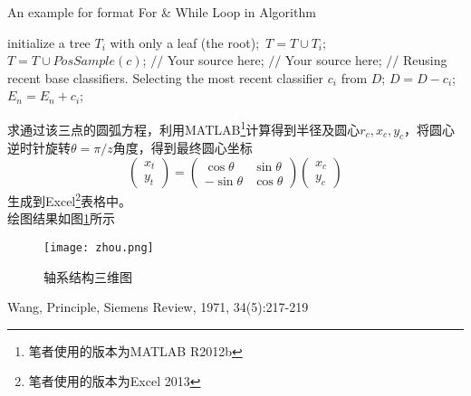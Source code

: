 \documentclass[UTF8,12px,a4paper]{ctexart} %
\numberwithin{equation}{section} %
\begin{document}
    \begin{algorithm}[t]
    \caption{An example for format For \& While Loop in Algorithm}
	\label{alg3}
    \begin{algorithmic}[1]
    \STATE initialize a tree $T_{i}$ with only a leaf (the root);\
    \STATE $T=T \cup T_{i};$\
    \ENDFOR
    \label{code:TrainBase:getc}
    \STATE $T=T \cup PosSample(c)$;
    \label{code:TrainBase:pos}
    \ENDFOR
    \STATE $//$ Your source here;
    \ENDFOR
    \STATE $//$ Your source here;
    \ENDFOR
    \STATE $//$ Reusing recent base classifiers.
    \label{code:recentStart}
    \WHILE {$(|E_n| \leq L_1 )and( D \neq \phi)$}
    \STATE Selecting the most recent classifier $c_i$ from $D$;
    \STATE $D=D-c_i$;
    \STATE $E_n=E_n+c_i$;
    \ENDWHILE
    \label{code:recentEnd}
    \end{algorithmic}
    \end{algorithm}
求通过该三点的圆弧方程，利用MATLAB\footnote{笔者使用的版本为MATLAB R2012b}计算得到半径及圆心$r_c, x_c, y_c$，将圆心逆时针旋转$\theta=\pi/z$角度，得到最终圆心坐标
\begin{equation}
	\begin{pmatrix}
		x_t \\ y_t
	\end{pmatrix}
	=
	\begin{pmatrix}
		\cos \theta & \sin \theta \\
		-\sin \theta & \cos \theta
	\end{pmatrix}
	\begin{pmatrix}
		x_c \\ y_c
	\end{pmatrix}
\end{equation}
生成到Excel\footnote{笔者使用的版本为Excel 2013}表格中。\\
绘图结果如图\ref{fig2}所示\\
\begin{figure}[htb]
	\texttt{[image: zhou.png]}
	\caption{轴系结构三维图}
	\label{fig2}
\end{figure}

\begin{thebibliography}{1}
Wang, Principle, Siemens Review, 1971, 34(5):217-219
\end{thebibliography}
\end{document}
